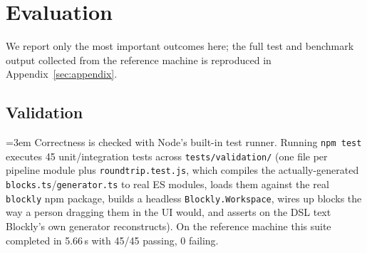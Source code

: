 \documentclass[runningheads]{llncs}
\begin{document}
\section{Evaluation}
\label{sec:evaluation}

We report only the most important outcomes here; the full test and benchmark output collected from the reference machine is reproduced in Appendix~\ref{sec:appendix}.

\subsection{Validation}
\label{sec:validation}
{\emergencystretch=3em
Correctness is checked with Node's built-in test runner. Running \texttt{npm test} executes 45 unit/integration tests across \texttt{tests\slash validation\slash} (one file per pipeline module plus \texttt{roundtrip.test.js}, which compiles the actually-generated \texttt{blocks.ts}\slash\texttt{generator.ts} to real ES modules, loads them against the real \texttt{blockly} npm package, builds a headless \texttt{Blockly.Workspace}, wires up blocks the way a person dragging them in the UI would, and asserts on the DSL text Blockly's own generator reconstructs). On the reference machine this suite completed in 5.66\,s with 45/45 passing, 0 failing.
\par}
\end{document}
